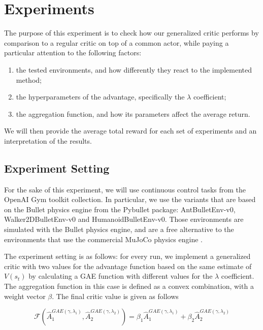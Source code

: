 \section{Experiments}
\label{sec:exp}

The purpose of this experiment is to check how our generalized critic performs by comparison to a regular critic on top of a common actor, while paying a particular attention to the following factors:
\begin{enumerate}
\item the tested environments, and how differently they react to the implemented method;
\item the hyperparameters of the advantage, specifically the $\lambda$ coefficient;
\item the aggregation function, and how its parameters affect the average return.
\end{enumerate}

We will then provide the average total reward for each set of experiments and an interpretation of the results.

\subsection{Experiment Setting}
For the sake of this experiment, we will use continuous control tasks from the OpenAI Gym \cite{brockman2016openai} toolkit collection. In particular, we use the variants that are based on the Bullet physics engine from the Pybullet package: AntBulletEnv-v0, Walker2DBulletEnv-v0 and HumanoidBulletEnv-v0. Those environments are simulated with the Bullet physics engine, and are a free alternative to the environments that use the commercial MuJoCo physics engine \cite{todorov2012mujoco}. 

The experiment setting is as follows: for every run, we implement a generalized critic with two values for the advantage function based on the same estimate of $V(s_t)$ by calculating a GAE function with different values for the $\lambda$ coefficient. The aggregation function in this case is defined as a convex combination, with a weight vector $\beta$. The final critic value is given as follows

\[ \mathcal{F}(\hat{A}_1^{GAE(\gamma, \lambda_1)}, \hat{A}_2^{GAE(\gamma, \lambda_2)}) = \beta_1\hat{A}_1^{GAE(\gamma, \lambda_1)}+\beta_2\hat{A}_2^{GAE(\gamma, \lambda_2)} \]

